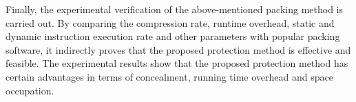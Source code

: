 \begin{eabstract}
Finally, the experimental verification of the above-mentioned packing method is carried out. By comparing the compression rate, runtime overhead, static and dynamic instruction execution rate and other parameters with popular packing software, it indirectly proves that the proposed protection method is effective and feasible. The experimental results show that the proposed protection method has certain advantages in terms of concealment, running time overhead and space occupation.

\end{eabstract}


